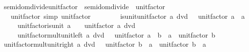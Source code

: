 \begin{isabellebody}
\isanewline
{}\isamarkupfalse%
\ semidom{\isacharunderscore}{\kern0pt}divide{\isacharunderscore}{\kern0pt}unit{\isacharunderscore}{\kern0pt}factor\ {\isacharequal}{\kern0pt}\ semidom{\isacharunderscore}{\kern0pt}divide\ {\isacharplus}{\kern0pt}\ unit{\isacharunderscore}{\kern0pt}factor\ {\isacharplus}{\kern0pt}\isanewline
\ \ \ unit{\isacharunderscore}{\kern0pt}factor{\isacharunderscore}{\kern0pt}{}\ {\isacharbrackleft}{\kern0pt}simp{\isacharbrackright}{\kern0pt}{\isacharcolon}{\kern0pt}\ {\isachardoublequoteopen}unit{\isacharunderscore}{\kern0pt}factor\ {}\ {\isacharequal}{\kern0pt}\ {}{\isachardoublequoteclose}\isanewline
\ \ \ \ \ is{\isacharunderscore}{\kern0pt}unit{\isacharunderscore}{\kern0pt}unit{\isacharunderscore}{\kern0pt}factor{\isacharcolon}{\kern0pt}\ {\isachardoublequoteopen}a\ dvd\ {}\ {\isasymLongrightarrow}\ unit{\isacharunderscore}{\kern0pt}factor\ a\ {\isacharequal}{\kern0pt}\ a{\isachardoublequoteclose}\isanewline
\ \ \ \ \ unit{\isacharunderscore}{\kern0pt}factor{\isacharunderscore}{\kern0pt}is{\isacharunderscore}{\kern0pt}unit{\isacharcolon}{\kern0pt}\ {\isachardoublequoteopen}a\ {\isasymnoteq}\ {}\ {\isasymLongrightarrow}\ unit{\isacharunderscore}{\kern0pt}factor\ a\ dvd\ {}{\isachardoublequoteclose}\isanewline
\ \ \ \ \ unit{\isacharunderscore}{\kern0pt}factor{\isacharunderscore}{\kern0pt}mult{\isacharunderscore}{\kern0pt}unit{\isacharunderscore}{\kern0pt}left{\isacharcolon}{\kern0pt}\ {\isachardoublequoteopen}a\ dvd\ {}\ {\isasymLongrightarrow}\ unit{\isacharunderscore}{\kern0pt}factor\ {\isacharparenleft}{\kern0pt}a\ {\isacharasterisk}{\kern0pt}\ b{\isacharparenright}{\kern0pt}\ {\isacharequal}{\kern0pt}\ a\ {\isacharasterisk}{\kern0pt}\ unit{\isacharunderscore}{\kern0pt}factor\ b{\isachardoublequoteclose}\isanewline
\ \ %
\isanewline
{}\isanewline
\isanewline
{}\isamarkupfalse%
\ unit{\isacharunderscore}{\kern0pt}factor{\isacharunderscore}{\kern0pt}mult{\isacharunderscore}{\kern0pt}unit{\isacharunderscore}{\kern0pt}right{\isacharcolon}{\kern0pt}\ {\isachardoublequoteopen}a\ dvd\ {}\ {\isasymLongrightarrow}\ unit{\isacharunderscore}{\kern0pt}factor\ {\isacharparenleft}{\kern0pt}b\ {\isacharasterisk}{\kern0pt}\ a{\isacharparenright}{\kern0pt}\ {\isacharequal}{\kern0pt}\ unit{\isacharunderscore}{\kern0pt}factor\ b\ {\isacharasterisk}{\kern0pt}\ a{\isachardoublequoteclose}\isanewline

\end{isabellebody}
